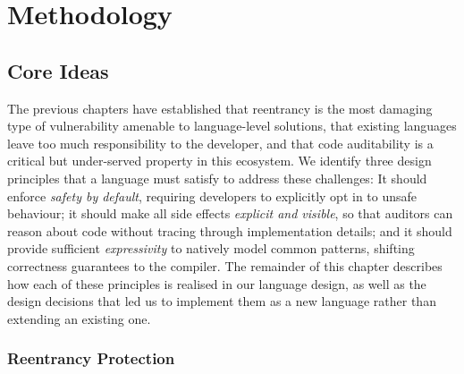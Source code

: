\chapter{Methodology}\label{ch:methodology}

\section{Core Ideas}

The previous chapters have established that reentrancy is the most damaging type of vulnerability amenable to language-level solutions, that existing languages leave too much responsibility to the developer, and that code auditability is a critical but under-served property in this ecosystem. We identify three design principles that a language must satisfy to address these challenges: It should enforce \textit{safety by default}, requiring developers to explicitly opt in to unsafe behaviour; it should make all side effects \textit{explicit and visible}, so that auditors can reason about code without tracing through implementation details; and it should provide sufficient \textit{expressivity} to natively model common patterns, shifting correctness guarantees to the compiler. The remainder of this chapter describes how each of these principles is realised in our language design, as well as the design decisions that led us to implement them as a new language rather than extending an existing one.

\subsection{Reentrancy Protection}

